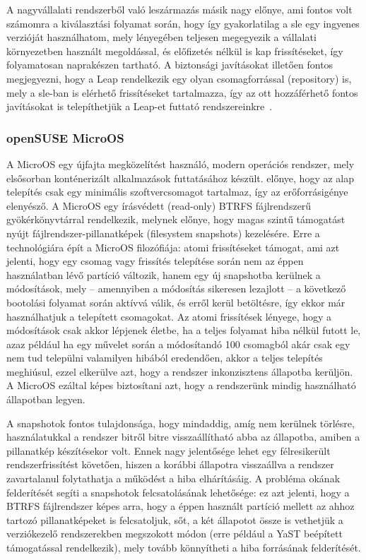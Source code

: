 A nagyvállalati rendszerből való leszármazás másik nagy előnye, ami fontos volt számomra a kiválasztási folyamat során, hogy így gyakorlatilag a \acrlong{sle} egy ingyenes verzióját használhatom, mely lényegében teljesen megegyezik a vállalati környezetben használt megoldással, és előfizetés nélkül is kap frissítéseket, így folyamatosan naprakészen tartható. A biztonsági javításokat illetően fontos megjegyezni, hogy a Leap rendelkezik egy olyan csomagforrással (repository) is, mely a \acrlong{sle}-ban is elérhető frissítéseket tartalmazza, így az ott hozzáférhető fontos javításokat is telepíthetjük a Leap-et futtató rendszereinkre~\cite{openSUSELeapSLERepo}.

\subsubsection{openSUSE MicroOS}
A MicroOS egy újfajta megközelítést használó, modern operációs rendszer, mely elsősorban konténerizált alkalmazások futtatásához készült.  előnye, hogy az alap telepítés csak egy minimális szoftvercsomagot tartalmaz, így az erőforrásigénye elenyésző. A MicroOS egy írásvédett (read-only) BTRFS fájlrendszerű gyökérkönyvtárral rendelkezik, melynek előnye, hogy magas szintű támogatást nyújt fájlrendszer-pillanatképek (filesystem snapshots) kezelésére.
Erre a technológiára épít a MicroOS filozófiája: atomi frissítéseket támogat, ami azt jelenti, hogy egy csomag vagy frissítés telepítése során nem az éppen használatban lévő partíció változik, hanem egy új snapshotba kerülnek a módosítások, mely -- amennyiben a módosítás sikeresen lezajlott -- a következő bootolási folyamat során aktívvá válik, és  erről kerül betöltésre, így ekkor már használhatjuk a telepített csomagokat. Az atomi frissítések lényege, hogy a módosítások csak akkor lépjenek életbe, ha a teljes folyamat hiba nélkül futott le, azaz például ha egy művelet során a módosítandó 100 csomagból akár csak egy nem tud települni valamilyen hibából eredendően, akkor a teljes telepítés meghiúsul, ezzel elkerülve azt, hogy a rendszer inkonzisztens állapotba kerüljön. A MicroOS ezáltal képes biztosítani azt, hogy a rendszerünk mindig használható állapotban legyen.

A snapshotok fontos tulajdonsága, hogy mindaddig, amíg nem kerülnek törlésre, használatukkal a rendszer bitről bitre visszaállítható abba az állapotba, amiben a pillanatkép készítésekor volt. Ennek nagy jelentősége lehet egy félresikerült rendszerfrissítést követően, hiszen a korábbi állapotra visszaállva a rendszer zavartalanul folytathatja a működést a hiba elhárításáig.
A probléma okának felderítését segíti a snapshotok felcsatolásának lehetősége: ez azt jelenti, hogy a BTRFS fájlrendszer képes arra, hogy a éppen használt partíció mellett az ahhoz tartozó pillanatképeket is felcsatoljuk, sőt, a két állapotot össze is vethetjük a verziókezelő rendszerekben megszokott módon (erre például a YaST beépített támogatással rendelkezik), mely tovább könnyítheti a hiba forrásának felderítését.

